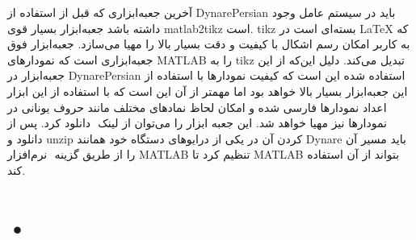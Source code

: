 \documentclass[12pt]{article}
\begin{document}
آخرین جعبه‌ابزاری که قبل از استفاده از DynarePersian باید در سیستم عامل وجود داشته باشد جعبه‌ابزار بسیار قوی matlab2tikz است. tikz بسته‌ای است در ‪\LaTeX‬‬ که به کاربر امکان رسم اشکال با کیفیت و دقت بسیار بالا را مهیا می‌سازد. جعبه‌ابزار فوق جعبه‌ابزاری است که نمودارهای MATLAB را به tikz تبدیل می‌کند. دلیل این‌که از این جعبه‌ابزار در DynarePersian استفاده شده این است که کیفیت نمودارها با استفاده از این جعبه‌ابزار بسیار بالا خواهد بود اما مهمتر از آن این است که با استفاده از این ابزار اعداد نمودارها فارسی شده و امکان لحاظ نمادهای مختلف مانند حروف یونانی در نمودارها نیز مهیا خواهد شد. این جعبه ابزار را می‌توان از لینک ‪‬‬‬‬ دانلود کرد. پس از دانلود و unzip کردن آن در یکی از درایوهای دستگاه خود همانند Dynare باید مسیر آن را از طریق گزینه ‪‬‬‬‬‬ نرم‌افزار MATLAB تنظیم کرد تا MATLAB بتواند از آن استفاده کند. ‪
\section{•}
\end{document}
